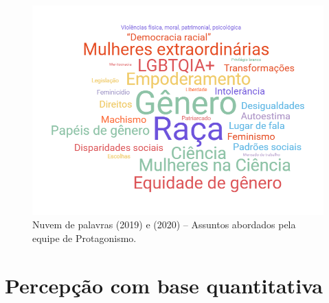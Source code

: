 \documentclass[
]{book}
\begin{document}
\begin{figure}

{\centering \includegraphics[width=1\linewidth,height=0.8\textheight]{images/image39} 

}

\caption{Nuvem de palavras (2019) e (2020) – Assuntos abordados pela equipe de Protagonismo.}\label{fig:mixword}
\end{figure}

\hypertarget{percepuxe7uxe3o-com-base-quantitativa}{%
\section{Percepção com base quantitativa}\label{percepuxe7uxe3o-com-base-quantitativa}}
\end{document}

